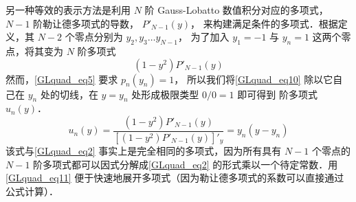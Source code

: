 另一种等效的表示方法是利用 $N$ 阶 Gauss-Lobatto 数值积分对应的多项式， $N-1$ 阶勒让德多项式的导数， $P'_{N-1}(y)$，  来构建满足条件的多项式．根据定义，其 $N-2$ 个零点分别为 $y_2, y_3\dots y_{N-1}$， 为了加入 $y_1=-1$ 与 $y_n=1$ 这两个零点，将其变为 $N$ 阶多项式
\begin{equation}\label{GLquad_eq10}
(1-y^2)P'_{N-1}(y)
\end{equation}
然而，\autoref{GLquad_eq5} 要求 $p_n(y_n)=1$， 所以我们将\autoref{GLquad_eq10} 除以它自己在 $y_n$ 处的切线，在 $y=y_n$ 处形成极限类型 $0/0=1$ 即可得到 阶多项式 $u_n(y)$． 
\begin{equation}\label{GLquad_eq11}
u_n(y) = \frac{(1-y^2)P'_{N-1}(y)}{[(1-y^2)P'_{N-1}(y)]'_y} = y_n (y-y_n)
\end{equation}
该式与\autoref{GLquad_eq2} 事实上是完全相同的多项式，因为所有具有 $N-1$ 个零点的 $N-1$ 阶多项式都可以因式分解成\autoref{GLquad_eq2} 的形式乘以一个待定常数．用\autoref{GLquad_eq11} 便于快速地展开多项式（因为勒让德多项式的系数可以直接通过公式计算）．
